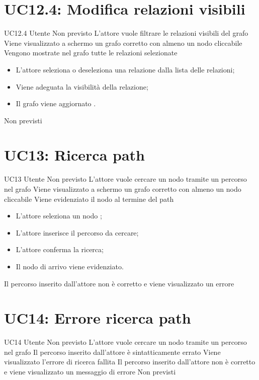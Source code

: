 \documentclass[../AnalisideiRequisiti.tex]{subfiles}
\begin{document}
	\section{UC12.4: Modifica relazioni visibili}
	\UserCase
	{UC12.4}
	{Utente}
	{Non previsto}
	{L'attore vuole filtrare le relazioni visibili del grafo}
	{Viene visualizzato a schermo un grafo corretto con almeno un nodo cliccabile }
	{Vengono mostrate nel grafo tutte le relazioni selezionate}
	{
		\begin{itemize}
			\item{} L'attore seleziona o deseleziona una relazione dalla lista delle relazioni;
			\item{} Viene adeguata la visibilità della relazione;
			\item{} Il grafo viene aggiornato .
		\end{itemize}
	}
	{Non previsti}
	
	\section{UC13: Ricerca path}
	\UserCase
	{UC13}
	{Utente}
	{Non previsto}
	{L'attore vuole cercare un nodo tramite un percorso nel grafo}
	{Viene visualizzato a schermo un grafo corretto con almeno un nodo cliccabile }
	{Viene evidenziato il nodo al termine del path}
	{
		\begin{itemize}
			\item{} L'attore seleziona un nodo ;
			\item{} L'attore inserisce il percorso da cercare;
			\item{} L'attore conferma la ricerca;
			\item{} Il nodo di arrivo viene evidenziato.
		\end{itemize}
	}
	{Il percorso inserito dall'attore non è corretto e viene visualizzato un errore }
	
	\section{UC14: Errore ricerca path}
	\UserCase
	{UC14}
	{Utente}
	{Non previsto}
	{L'attore vuole cercare un nodo tramite un percorso nel grafo}
	{Il percorso inserito dall'attore è sintatticamente errato}
	{Viene visualizzato l'errore di ricerca fallita}
	{Il percorso inserito dall'attore non è corretto e viene visualizzato un messaggio di errore}
	{Non previsti}
	
\end{document}
